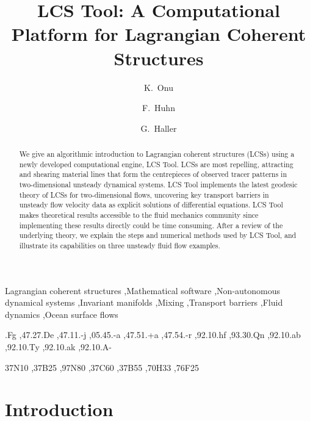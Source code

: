 \documentclass[5p]{elsarticle}
\begin{document}
\begin{frontmatter}

\title{LCS Tool: A Computational Platform for Lagrangian Coherent Structures}

\author{K.~Onu}

\author{F.~Huhn}

\author{G.~Haller}


\address{Institute of Mechanical Systems, ETH Zurich, Switzerland}

\begin{abstract}
We give an algorithmic introduction to Lagrangian coherent structures (LCSs) using a newly developed computational engine, LCS Tool. LCSs are most repelling, attracting and shearing material lines that form the centrepieces of observed tracer patterns in two-dimensional unsteady dynamical systems. LCS Tool implements the latest geodesic theory of LCSs for two-dimensional flows, uncovering key transport barriers in unsteady flow velocity data as explicit solutions of differential equations. LCS Tool makes theoretical results accessible to the fluid mechanics community since implementing these results directly could be time consuming. After a review of the underlying theory, we explain the steps and numerical methods used by LCS Tool, and illustrate its capabilities on three unsteady fluid flow examples.
\end{abstract}

\begin{keyword}
Lagrangian coherent structures \sep Mathematical software \sep Non-autonomous dynamical systems \sep Invariant manifolds \sep Mixing \sep Transport barriers \sep Fluid dynamics \sep Ocean surface flows

.Fg \sep 47.27.De \sep 47.11.-j \sep 05.45.-a \sep 47.51.+a \sep 47.54.-r \sep 92.10.hf \sep 93.30.Qn \sep 92.10.ab \sep 92.10.Ty \sep 92.10.ak \sep 92.10.A-

\MSC[2010] 37N10 \sep 37B25 \sep 97N80 \sep 37C60 \sep 37B55 \sep 70H33 \sep 76F25
\end{keyword}

\end{frontmatter}

\section{Introduction}
\end{document}
